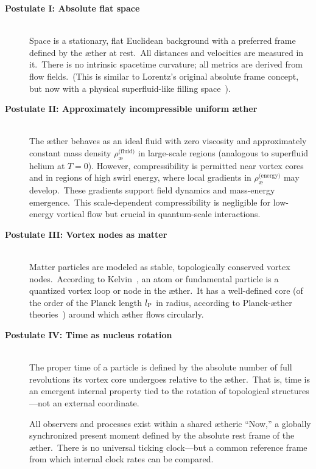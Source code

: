 \begin{description}
    \item[\textbf{Postulate I: Absolute flat space}] \hfill \\
    Space is a stationary, flat Euclidean background with a preferred frame defined by the æther at rest.\ All distances and velocities are measured in it.\ There is no intrinsic spacetime curvature; all metrics are derived from flow fields.\ (This is similar to Lorentz's original absolute frame concept, but now with a physical superfluid-like filling space~\cite{Winterberg2002-PlanckÆther}).

    \item[\textbf{Postulate II: Approximately incompressible uniform æther}] \hfill \\
    The æther behaves as an ideal fluid with zero viscosity and approximately constant mass density \textbf{$\rho^{\text{(fluid)}}_{\text{\ae}}$} in large-scale regions (analogous to superfluid helium at $T=0$). However, compressibility is permitted near vortex cores and in regions of high swirl energy, where local gradients in \textbf{$\rho^{\text{(energy)}}_{\text{\ae}}$} may develop.\ These gradients support field dynamics and mass-energy emergence.\ This scale-dependent compressibility is negligible for low-energy vortical flow but crucial in quantum-scale interactions.

    \item[\textbf{Postulate III: Vortex nodes as matter}] \hfill \\
    Matter particles are modeled as stable, topologically conserved vortex nodes.\ According to Kelvin~\cite{Kelvin1867-vortex}, an atom or fundamental particle is a quantized vortex loop or node in the æther.\ It has a well-defined core (of the order of the Planck length $l_{\textrm P}$ in radius, according to Planck-æther theories~\cite{Winterberg2002-PlanckÆther}) around which æther flows circularly.

    \item[\textbf{Postulate IV: Time as nucleus rotation}] \hfill \\
    The proper time of a particle is defined by the absolute number of full revolutions its vortex core undergoes relative to the æther.\ That is, time is an emergent internal property tied to the rotation of topological structures—not an external coordinate.

    All observers and processes exist within a shared ætheric “Now,” a globally synchronized present moment defined by the absolute rest frame of the æther.\ There is no universal ticking clock—but a common reference frame from which internal clock rates can be compared.


\end{description}
